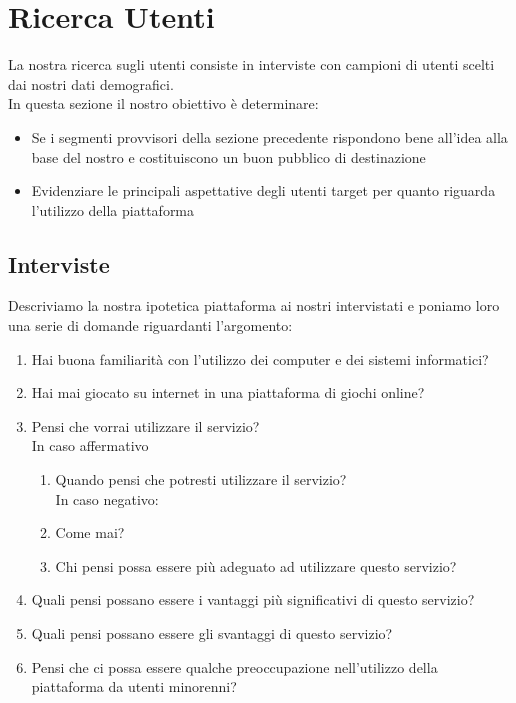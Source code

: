 \documentclass[../Report.tex]{subfiles}
\begin{document}
    \section{Ricerca Utenti}
    
    La nostra ricerca sugli utenti consiste in interviste con campioni di utenti scelti dai nostri dati demografici.\\
    In questa sezione il nostro obiettivo è determinare:
    \begin{itemize}
        \item Se i segmenti provvisori della sezione precedente rispondono bene all’idea alla base del nostro e costituiscono un buon pubblico di destinazione
        \item Evidenziare le principali aspettative degli utenti target per quanto riguarda l’utilizzo della piattaforma
    \end{itemize}

    
    \subsection{Interviste}
    \label{section:interviste}
    Descriviamo la nostra ipotetica piattaforma ai nostri intervistati e poniamo loro una serie di domande riguardanti l’argomento:
   
    \begin{enumerate}
    \item Hai buona familiarità con l’utilizzo dei computer e dei sistemi informatici?
    \item Hai mai giocato su internet in una piattaforma di giochi online?
    \item Pensi che vorrai utilizzare il servizio?\\
         In caso affermativo\\
        \begin{enumerate}
            \item Quando pensi che potresti utilizzare il servizio?\\ 
             In caso negativo: 
            \item Come mai?
            \item Chi pensi possa essere più adeguato ad utilizzare questo servizio?
        \end{enumerate}
    \item	Quali pensi possano essere i vantaggi più significativi di questo servizio?
    \item	Quali pensi possano essere gli svantaggi di questo servizio?
    \item	Pensi che ci possa essere qualche preoccupazione nell’utilizzo della piattaforma da utenti minorenni?
    \end{enumerate}
\end{document}
